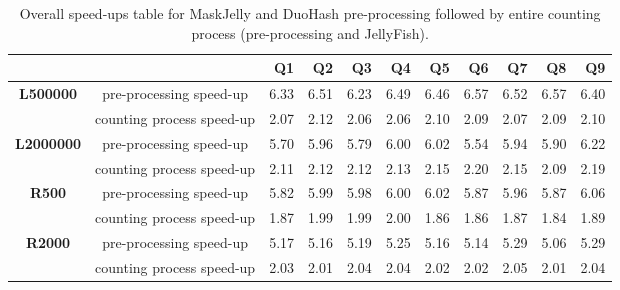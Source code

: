 \begin{sidewaystable}
	\centering
	\begin{tabular}{cc | rrrrrrrrr}
		& & \textbf{Q1} & \textbf{Q2} & \textbf{Q3} & \textbf{Q4} & \textbf{Q5} & \textbf{Q6} & \textbf{Q7} & \textbf{Q8} & \textbf{Q9} \\
		\toprule
		\multirow{2}{*}{\textbf{L500000}}
		& pre-processing speed-up & 6.33 & 6.51 & 6.23 & 6.49 & 6.46 & 6.57 & 6.52 & 6.57 & 6.40 \\
		\cmidrule{2-11}
		& counting process speed-up & 2.07 & 2.12 & 2.06 & 2.06 & 2.10 & 2.09 & 2.07 & 2.09 & 2.10 \\
		
		\midrule[\heavyrulewidth]
		
		\multirow{2}{*}{\textbf{L2000000}}
		& pre-processing speed-up & 5.70 & 5.96 & 5.79 & 6.00 & 6.02 & 5.54 & 5.94 & 5.90 & 6.22 \\
		\cmidrule{2-11}
		& counting process speed-up & 2.11 & 2.12 & 2.12 & 2.13 & 2.15 & 2.20 & 2.15 & 2.09 & 2.19 \\
		
		\midrule[\heavyrulewidth]
		
		\multirow{2}{*}{\textbf{R500}}
		& pre-processing speed-up & 5.82 & 5.99 & 5.98 & 6.00 & 6.02 & 5.87 & 5.96 & 5.87 & 6.06 \\
		\cmidrule{2-11}
		& counting process speed-up & 1.87 & 1.99 & 1.99 & 2.00 & 1.86 & 1.86 & 1.87 & 1.84 & 1.89 \\
		
		\midrule[\heavyrulewidth]
		
		\multirow{2}{*}{\textbf{R2000}}
		& pre-processing speed-up & 5.17 & 5.16 & 5.19 & 5.25 & 5.16 & 5.14 & 5.29 & 5.06 & 5.29 \\
		\cmidrule{2-11}
		& counting process speed-up & 2.03 & 2.01 & 2.04 & 2.04 & 2.02 & 2.02 & 2.05 & 2.01 & 2.04 \\
		
		\bottomrule
	\end{tabular}
	\caption[Overall speed-ups table for MaskJelly and DuoHash pre-processing.]{Overall speed-ups table for MaskJelly and DuoHash pre-processing followed by entire counting process (pre-processing and JellyFish).}
	\label{tab:speedup-maskjelly-duohash}
\end{sidewaystable}
